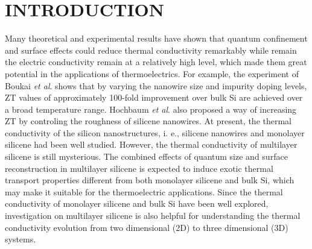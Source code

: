 \documentclass[aps,prb,twocolumn,showpacs,amsmath,amssymb]{revtex4-1}
\begin{document}
\maketitle

\section{INTRODUCTION}

Many theoretical and experimental results have shown that quantum confinement and surface effects could reduce thermal conductivity remarkably while remain the electric conductivity remain at a relatively high level, which made them great potential in the applications of thermoelectrics. For example, the experiment of Boukai \emph{et al}.\cite{Boukai2008} shows that by varying the nanowire size and impurity doping levels, ZT values of approximately 100-fold improvement over bulk Si are achieved over a broad temperature range. Hochbaum \emph{et al}.\cite{Hochbaum2008} also proposed a way of increasing ZT by controling the roughness of silicene nanowires. At present, the thermal conductivity of the silicon nanostructures, i. e.,  silicene nanowires\cite{Hochbaum2008,Yang2010,Shi2009,Boukai2008} and monolayer silicene\cite{Pei2013,Ng2013,Xie2014,Zhang2014,Liu2014,Wang2015,Zhang2015a,Chen2016} had been well studied. However, the thermal conductivity of multilayer silicene is still mysterious.
The combined effects of quantum size and surface reconstruction in multilayer silicene is expected to induce exotic thermal transport properties different from both monolayer silicene and bulk Si,  which may make it suitable for the thermoelectric applications. Since the thermal conductivity of monolayer silicene and  bulk Si have been well explored, investigation on multilayer silicene is also helpful for understanding the thermal conductivity  evolution from two dimensional (2D) to three dimensional (3D) systems.
\end{document}
